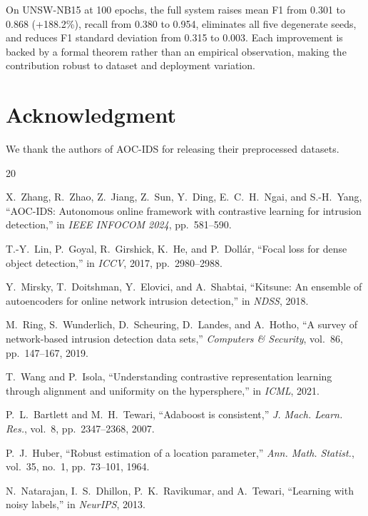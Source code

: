 \documentclass[conference]{IEEEtran}
\begin{document}
On UNSW-NB15 at 100 epochs, the full system raises mean F1 from 0.301
to 0.868 (+188.2\%), recall from 0.380 to 0.954, eliminates all five
degenerate seeds, and reduces F1 standard deviation from 0.315 to 0.003.
Each improvement is backed by a formal theorem rather than an empirical
observation, making the contribution robust to dataset and deployment variation.

\section*{Acknowledgment}
We thank the authors of AOC-IDS for releasing their preprocessed datasets.

\begin{thebibliography}{20}

X.~Zhang, R.~Zhao, Z.~Jiang, Z.~Sun, Y.~Ding, E.~C.~H.~Ngai, and
S.-H.~Yang, ``AOC-IDS: Autonomous online framework with contrastive learning
for intrusion detection,'' in \textit{IEEE INFOCOM 2024}, pp.~581--590.

T.-Y.~Lin, P.~Goyal, R.~Girshick, K.~He, and P.~Dollár,
``Focal loss for dense object detection,'' in \textit{ICCV}, 2017,
pp.~2980--2988.

Y.~Mirsky, T.~Doitshman, Y.~Elovici, and A.~Shabtai,
``Kitsune: An ensemble of autoencoders for online network intrusion detection,''
in \textit{NDSS}, 2018.

M.~Ring, S.~Wunderlich, D.~Scheuring, D.~Landes, and A.~Hotho,
``A survey of network-based intrusion detection data sets,''
\textit{Computers \& Security}, vol.~86, pp.~147--167, 2019.

T.~Wang and P.~Isola,
``Understanding contrastive representation learning through alignment and
uniformity on the hypersphere,'' in \textit{ICML}, 2021.

P.~L.~Bartlett and M.~H.~Tewari,
``Adaboost is consistent,''
\textit{J. Mach. Learn. Res.}, vol.~8, pp.~2347--2368, 2007.

P.~J.~Huber,
``Robust estimation of a location parameter,''
\textit{Ann. Math. Statist.}, vol.~35, no.~1, pp.~73--101, 1964.

N.~Natarajan, I.~S.~Dhillon, P.~K.~Ravikumar, and A.~Tewari,
``Learning with noisy labels,'' in \textit{NeurIPS}, 2013.


\end{thebibliography}
\end{document}
